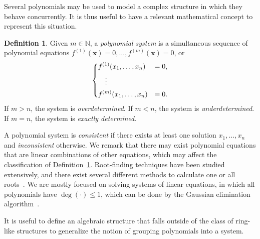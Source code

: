 \documentclass[12pt, a4paper, oneside]{memoir}
\theoremstyle{definition}
\newtheorem{definition}[theorem]{Definition}
\begin{document}
Several polynomials may be used to model a complex structure in which they behave concurrently. It is thus useful to have a relevant mathematical concept to represent this situation.

\begin{definition}\label{def:poly-sys}
  Given $m \in \mathbb{N}$, a \emph{polynomial system} is a simultaneous sequence of polynomial equations $f^{(1)}(\mathbf{x}) = 0, \dots, f^{(m)}(\mathbf{x}) = 0$, or
  \begin{align}
    \begin{dcases}
      f^{(1)}(x_{1}, \dots, x_{n}) &= 0, \\
      \quad \vdots \\
      f^{(m)}(x_{1}, \dots, x_{n}) &= 0.
    \end{dcases}
  \end{align}
  If $m > n$, the system is \emph{overdetermined}. If $m < n$, the system is \emph{underdetermined}. If $m = n$, the system is \emph{exactly determined}.
\end{definition}

A polynomial system is \emph{consistent} if there exists at least one solution $x_{1}, \dots, x_{n}$ and \emph{inconsistent} otherwise. We remark that there may exist polynomial equations that are linear combinations of other equations, which may affect the classification of Definition~\ref{def:poly-sys}. Root-finding techniques have been studied extensively, and there exist several different methods to calculate one or all roots~\cite[Chap.~9]{Press:2007}. We are mostly focused on solving systems of linear equations, in which all polynomials have $\deg(\cdot) \leq 1$, which can be done by the Gaussian elimination algorithm~\cite[Sec.~2.2]{Press:2007}.

It is useful to define an algebraic structure that falls outside of the class of ring-like structures to generalize the notion of grouping polynomials into a system.
\end{document}
